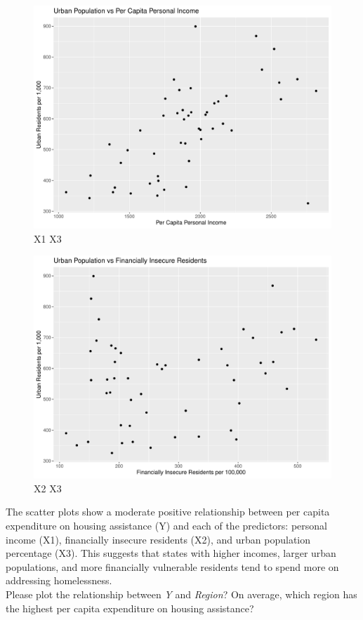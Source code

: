\documentclass[12pt,letterpaper]{article}
\begin{document}
\begin{itemize}
\begin{figure}[h!]\centering
	\caption{\footnotesize X1 X3}
	\label{fig:8}
	\includegraphics[width=.75\textwidth]{plot_X1_X3.pdf}
\end{figure}

\begin{figure}[h!]\centering
	\caption{\footnotesize X2 X3}
	\label{fig:9}
	\includegraphics[width=.75\textwidth]{plot_X2_X3.pdf}
\end{figure}

The scatter plots show a moderate positive relationship between per capita expenditure on housing assistance (Y) and each of the predictors: personal income (X1), financially insecure residents (X2), and urban population percentage (X3). This suggests that states with higher incomes, larger urban populations, and more financially vulnerable residents tend to spend more on addressing homelessness.\\

Please plot the relationship between \emph{Y} and \emph{Region}? On average, which region has the highest per capita expenditure on housing assistance?
\vspace{.2cm}
 


\end{itemize}
\end{document}
